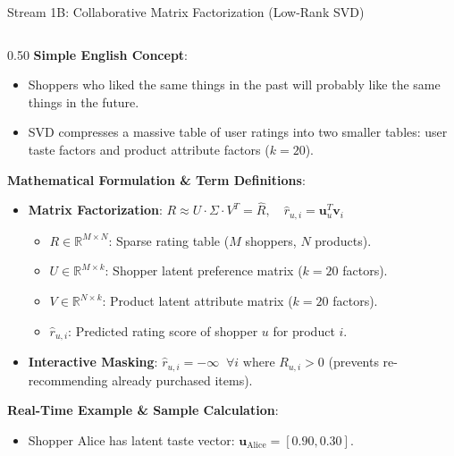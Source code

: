 \documentclass[10pt]{beamer}
\begin{document}
\begin{frame}[fragile]{Stream 1B: Collaborative Matrix Factorization (Low-Rank SVD)}
\begin{columns}[T]
    \begin{column}{0.50\textwidth}
        {\color{brandred}\textbf{Simple English Concept}}:
        \begin{itemize}\scriptsize
            \item Shoppers who liked the same things in the past will probably like the same things in the future.
            \item SVD compresses a massive table of user ratings into two smaller tables: user taste factors and product attribute factors ($k=20$).
        \end{itemize}
        {\color{brandorange}\textbf{Mathematical Formulation \& Term Definitions}}:
        \begin{itemize}\scriptsize
            \item \textbf{Matrix Factorization}: $R \approx U \cdot \Sigma \cdot V^T = \hat{R}, \quad \hat{r}_{u, i} = \mathbf{u}_u^T \mathbf{v}_i$
            \begin{itemize}\tiny
                \item $R \in \mathbb{R}^{M \times N}$: Sparse rating table ($M$ shoppers, $N$ products).
                \item $U \in \mathbb{R}^{M \times k}$: Shopper latent preference matrix ($k=20$ factors).
                \item $V \in \mathbb{R}^{N \times k}$: Product latent attribute matrix ($k=20$ factors).
                \item $\hat{r}_{u, i}$: Predicted rating score of shopper $u$ for product $i$.
            \end{itemize}
            \item \textbf{Interactive Masking}: $\hat{r}_{u, i} = -\infty \;\; \forall i \text{ where } R_{u, i} > 0$ (prevents re-recommending already purchased items).
        \end{itemize}
        {\color{brandred}\textbf{Real-Time Example \& Sample Calculation}}:
        \begin{itemize}\scriptsize
            \item Shopper Alice has latent taste vector: $\mathbf{u}_{\text{Alice}} = [0.90, 0.30]$.

\end{itemize}
\end{column}
\end{columns}
\end{frame}
\end{document}
